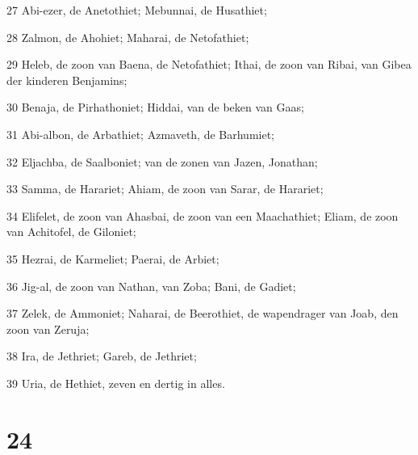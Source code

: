 \par 27 Abi-ezer, de Anetothiet; Mebunnai, de Husathiet;
\par 28 Zalmon, de Ahohiet; Maharai, de Netofathiet;
\par 29 Heleb, de zoon van Baena, de Netofathiet; Ithai, de zoon van Ribai, van Gibea der kinderen Benjamins;
\par 30 Benaja, de Pirhathoniet; Hiddai, van de beken van Gaas;
\par 31 Abi-albon, de Arbathiet; Azmaveth, de Barhumiet;
\par 32 Eljachba, de Saalboniet; van de zonen van Jazen, Jonathan;
\par 33 Samma, de Harariet; Ahiam, de zoon van Sarar, de Harariet;
\par 34 Elifelet, de zoon van Ahasbai, de zoon van een Maachathiet; Eliam, de zoon van Achitofel, de Giloniet;
\par 35 Hezrai, de Karmeliet; Paerai, de Arbiet;
\par 36 Jig-al, de zoon van Nathan, van Zoba; Bani, de Gadiet;
\par 37 Zelek, de Ammoniet; Naharai, de Beerothiet, de wapendrager van Joab, den zoon van Zeruja;
\par 38 Ira, de Jethriet; Gareb, de Jethriet;
\par 39 Uria, de Hethiet, zeven en dertig in alles.

\chapter{24}

